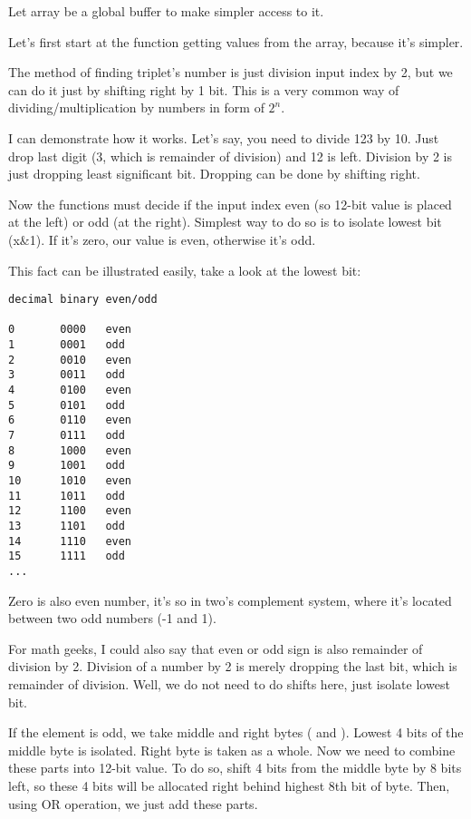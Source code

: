Let array be a global buffer to make simpler access to it.


Let's first start at the function getting values from the array, because it's simpler.

The method of finding triplet's number is just division input index by 2, but we can do it just by shifting right by 1 bit.
This is a very common way of dividing/multiplication by numbers in form of $2^n$.

I can demonstrate how it works. Let's say, you need to divide 123 by 10.
Just drop last digit (3, which is remainder of division) and 12 is left.
Division by 2 is just dropping least significant bit. Dropping can be done by shifting right.

Now the functions must decide if the input index even (so 12-bit value is placed at the left) or odd (at the right).
Simplest way to do so is to isolate lowest bit (x\&1). If it's zero, our value is even, otherwise it's odd.

This fact can be illustrated easily, take a look at the lowest bit:

\begin{lstlisting}
decimal binary even/odd

0       0000   even
1       0001   odd
2       0010   even
3       0011   odd
4       0100   even
5       0101   odd
6       0110   even
7       0111   odd
8       1000   even
9       1001   odd
10      1010   even
11      1011   odd
12      1100   even
13      1101   odd
14      1110   even
15      1111   odd
...
\end{lstlisting}

Zero is also even number, it's so in two's complement system,
where it's located between two odd numbers (-1 and 1).

For math geeks, I could also say that even or odd sign is also remainder of division by 2.
Division of a number by 2 is merely dropping the last bit, which is remainder of division.
Well, we do not need to do shifts here, just isolate lowest bit.

If the element is odd, we take middle and right bytes ( and ).
Lowest 4 bits of the middle byte is isolated.
Right byte is taken as a whole.
Now we need to combine these parts into 12-bit value.
To do so, shift 4 bits from the middle byte by 8 bits left, so these 4 bits will be allocated right behind highest 8th bit of byte.
Then, using OR operation, we just add these parts.

